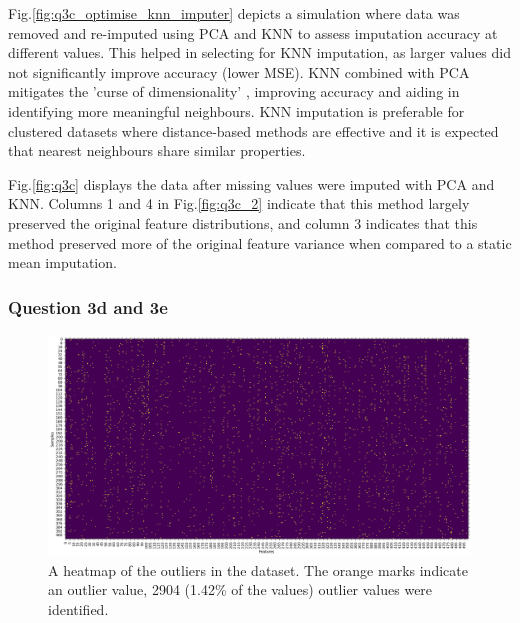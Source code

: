     Fig.\eqref{fig:q3c_optimise_knn_imputer} depicts a simulation where data was removed and re-imputed using PCA and
    KNN to assess imputation accuracy at different  values.
    This helped in selecting  for KNN imputation, as larger  values did not significantly
    improve accuracy (lower MSE).
    KNN combined with PCA mitigates the 'curse of dimensionality' \cite{bellman1957}, improving accuracy and aiding in
    identifying more meaningful neighbours.
    KNN imputation is preferable for clustered datasets where distance-based methods are effective and it is expected
    that nearest neighbours share similar properties.

    Fig.\eqref{fig:q3c} displays the data after missing values were imputed with PCA and KNN.
    Columns 1 and 4 in Fig.\eqref{fig:q3c_2} indicate that this method largely preserved the original feature distributions,
    and column 3 indicates that this method preserved more of the original feature variance when compared to a static
    mean imputation.

\subsubsection{Question 3d and 3e}\label{subsubsec:q3de}
    \begin{figure}[htb]
    \centering
    \includegraphics[width=1\textwidth]{./figures/q3d_heatmap}
    \caption{A heatmap of the outliers in the  dataset. The orange marks indicate an
        outlier value, 2904 (1.42\% of the values) outlier values were identified.}
    \label{fig:q3d_heatmap}
    \end{figure}

